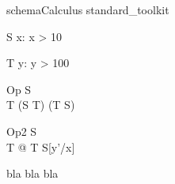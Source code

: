 \begin{zsection}
   \SECTION schemaCalculus \parents standard\_toolkit
\end{zsection}

\begin{schema}{S}
   x: \nat
\where
   x > 10
\end{schema}

\begin{schema}{T}
   y: \nat
\where
   y > 100
\end{schema}

\begin{schema}{Op}
   \Delta S \\
   \Delta T
\where
   (\lnot S \land T) \lor (\lnot T \land S)
\end{schema}

\begin{schema}{Op2}
   \Xi S \\
\where
   \exists \Delta T @ \lnot T \land \lnot S[y'/x]
\end{schema}

bla bla bla